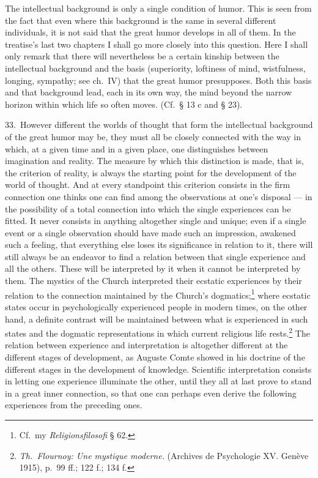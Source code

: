 \documentclass[12pt]{book}
\newcommand{\opage}[1]{\marginnote{\footnotesize\textit{[#1]}}}
\begin{document}
The intellectual background is only a single condition of humor. This is seen from the
fact that even where this background is the same in several different individuals, it is
not said that the great humor develops in all of them. In the treatise's last two chapters
I shall go more closely into this question. Here I shall only remark that there will
nevertheless be a certain kinship between the intellectual background and the basis
(superiority, loftiness of mind, wistfulness, longing, sympathy; see ch.~IV) that the
great humor presupposes. Both this basis and that background lead, \opage{114}each in its
own way, the mind beyond the narrow horizon within which life so often moves. (Cf.\ § 13 c
and § 23).

33.~However different the worlds of thought that form the intellectual background of the
great humor may be, they must all be closely connected with the way in which, at a given
time and in a given place, one distinguishes between imagination and reality. The measure
by which this distinction is made, that is, the criterion of reality, is always the
starting point for the development of the world of thought. And at every standpoint this
criterion consists in the firm connection one thinks one can find among the observations
at one's disposal --- in the possibility of a total connection into which the single
experiences can be fitted. It never consists in anything altogether single and unique;
even if a single event or a single observation should have made such an impression,
awakened such a feeling, that everything else loses its significance in relation to it,
there will still always be an endeavor to find a relation between that single experience
and all the others. These will be interpreted by it when it cannot be interpreted by them.
The mystics of the Church interpreted their ecstatic experiences by their relation to the
connection maintained by the Church's dogmatics;\footnote{Cf.\ my
\textit{Religionsfilosofi} § 62.} where ecstatic states occur in psychologically
experienced people in modern times, on the other hand, a definite contrast will be
maintained between what is experienced in such states and the dogmatic representations in
which current religious life rests.\footnote{\textit{Th.~Flournoy: Une mystique moderne.}
(Archives de Psychologie XV. Genève 1915), p.~99 ff.; 122 f.; 134 f.} The relation between
experience and interpretation is altogether different at the different stages of
development, as Auguste Comte showed in his doctrine of the different stages in the
development of knowledge. Scientific interpretation consists in letting one experience
illuminate the other, until they all at last prove to stand in a great inner connection,
so that one can perhaps even derive the following experiences from the preceding ones.
\end{document}
